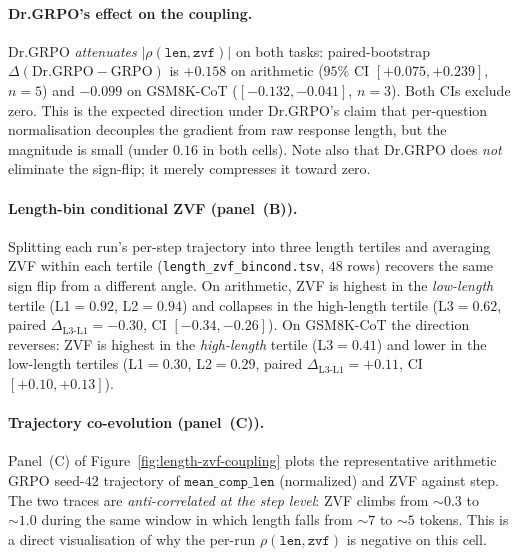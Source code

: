 \paragraph{Dr.GRPO's effect on the coupling.}
Dr.GRPO \emph{attenuates} $|\rho(\texttt{len},\texttt{zvf})|$ on
both tasks: paired-bootstrap
$\Delta(\text{Dr.GRPO}{-}\text{GRPO})$ is $+0.158$ on arithmetic
($95\%$ CI $[+0.075,+0.239]$, $n{=}5$) and $-0.099$ on GSM8K-CoT
($[-0.132,-0.041]$, $n{=}3$). Both CIs exclude zero. This is the
expected direction under Dr.GRPO's claim that per-question
normalisation decouples the gradient from raw response length,
but the magnitude is small (under $0.16$ in both cells). Note
also that Dr.GRPO does \emph{not} eliminate the sign-flip; it
merely compresses it toward zero.

\paragraph{Length-bin conditional ZVF (panel~(B)).}
Splitting each run's per-step trajectory into three length
tertiles and averaging ZVF within each tertile
(\texttt{length\_zvf\_bincond.tsv}, $48$ rows) recovers the same
sign flip from a different angle. On arithmetic, ZVF is highest
in the \emph{low-length} tertile (L1$=0.92$, L2$=0.94$) and
collapses in the high-length tertile (L3$=0.62$, paired
$\Delta_{\text{L3-L1}}{=}-0.30$, CI $[-0.34,-0.26]$). On
GSM8K-CoT the direction reverses: ZVF is highest in the
\emph{high-length} tertile (L3$=0.41$) and lower in the
low-length tertiles (L1$=0.30$, L2$=0.29$, paired
$\Delta_{\text{L3-L1}}{=}+0.11$, CI $[+0.10,+0.13]$).

\paragraph{Trajectory co-evolution (panel~(C)).}
Panel~(C) of Figure~\ref{fig:length-zvf-coupling} plots the
representative arithmetic GRPO seed-$42$ trajectory of
$\texttt{mean\_comp\_len}$ (normalized) and ZVF against step. The
two traces are \emph{anti-correlated at the step level}: ZVF
climbs from $\sim0.3$ to $\sim1.0$ during the same window in
which length falls from $\sim7$ to $\sim5$ tokens. This is a
direct visualisation of why the per-run
$\rho(\texttt{len}, \texttt{zvf})$ is negative on this cell.

